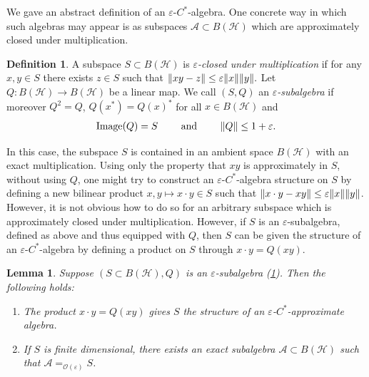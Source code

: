 \documentclass[11pt,reqno]{amsart}
\newtheorem{lemma}[theorem]{Lemma}
\theoremstyle{definition}
\newtheorem{definition}[theorem]{Definition}
\theoremstyle{remark}
\numberwithin{equation}{section}
\newcommand{\eps}{\varepsilon}
\newcommand{\cA}{\mathcal A}
\newcommand{\cH}{\mathcal H}
\newcommand{\bigO}{\mathcal O}
\DeclarePairedDelimiter\norm{\lVert}{\rVert}
\newcommand{\approxEq}[1]{=_{#1}}
\begin{document}
We gave an abstract definition of an $\eps$-$C^*$-algebra.
One concrete way in which such algebras may appear is as subspaces $\cA \subset B(\cH)$ which are approximately closed under multiplication.
\begin{definition}\label{def:eps-subalgebra}
    A subspace $S \subset B(\cH)$ is \emph{$\eps$-closed under multiplication} if for any $x, y \in S$ there exists $z \in S$ such that $\norm{xy-z} \leq \eps \norm{x}\norm{y}.$
    Let $Q : B(\cH) \to B(\cH)$ be a linear map.
    We call $(S, Q)$ an \emph{$\eps$-subalgebra} if moreover $Q^2 = Q$, $Q(x^*) = Q(x)^*$ for all $x \in B(\cH)$ and
    \begin{align*}
        \mathrm{Image}(Q) = S \qquad \text{ and } \qquad \norm{Q} \leq 1 + \eps.
    \end{align*}
\end{definition}

In this case, the subspace $S$ is contained in an ambient space $B(\cH)$ with an exact multiplication. Using only the property that $xy$ is approximately in  $S$, without using $Q$,
one might try to construct an $\eps$-$C^*$-algebra structure on $S$ by defining a new bilinear product $x, y \mapsto x \cdot y \in S$ such that $\norm{x \cdot y - xy} \leq \eps \norm{x}\norm{y}$.
However, it is not obvious how to do so for an arbitrary subspace which is approximately closed under multiplication.
However, if  $S$ is an $\eps$-subalgebra, defined as above and thus equipped with $Q$, then $S$ can be given the structure of an $\eps$-$C^*$-algebra by defining a product on $S$ through $x \cdot y = Q(xy)$.

\begin{lemma}\label{lemma:eps-subalgebra}
    Suppose $(S \subset B(\cH), Q)$ is an $\eps$-subalgebra (\cref{def:eps-subalgebra}).
    Then the following holds:
    \begin{enumerate}
        \item\label{it:approx product} The product $x \cdot y = Q(xy)$ gives $S$ the structure of an $\eps$-$C^*$-approximate algebra.
        \item\label{it:close subalgebra} If $S$ is finite dimensional, there exists an exact subalgebra $\cA \subset B(\cH)$ such that $\cA \approxEq{\bigO(\eps)} S$.
    \end{enumerate}
\end{lemma}
\end{document}
